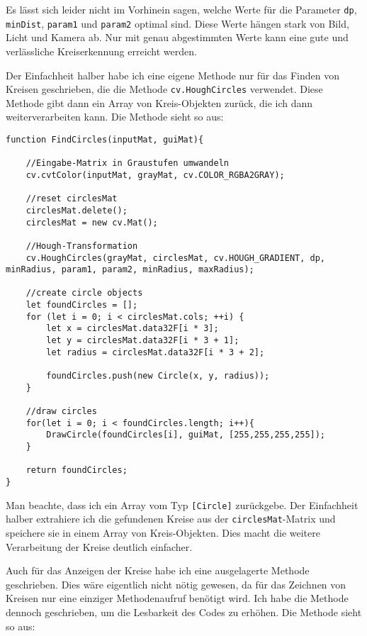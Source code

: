 Es lässt sich leider nicht im Vorhinein sagen, welche Werte für die Parameter \texttt{dp}, \texttt{minDist}, \texttt{param1} und \texttt{param2} optimal sind. Diese Werte hängen stark von Bild, Licht und Kamera ab. Nur mit genau abgestimmten Werte kann eine gute und verlässliche Kreiserkennung erreicht werden.

Der Einfachheit halber habe ich eine eigene Methode nur für das Finden von Kreisen geschrieben, die die Methode \texttt{cv.HoughCircles} verwendet. Diese Methode gibt dann ein Array von Kreis-Objekten zurück, die ich dann weiterverarbeiten kann. Die Methode sieht so aus:

\begin{lstlisting}[style=JavaScript]
function FindCircles(inputMat, guiMat){

    //Eingabe-Matrix in Graustufen umwandeln
    cv.cvtColor(inputMat, grayMat, cv.COLOR_RGBA2GRAY);

    //reset circlesMat
    circlesMat.delete();
    circlesMat = new cv.Mat();

    //Hough-Transformation
    cv.HoughCircles(grayMat, circlesMat, cv.HOUGH_GRADIENT, dp, minRadius, param1, param2, minRadius, maxRadius);

    //create circle objects
    let foundCircles = [];
    for (let i = 0; i < circlesMat.cols; ++i) {
        let x = circlesMat.data32F[i * 3];
        let y = circlesMat.data32F[i * 3 + 1];
        let radius = circlesMat.data32F[i * 3 + 2];

        foundCircles.push(new Circle(x, y, radius));
    }

    //draw circles
    for(let i = 0; i < foundCircles.length; i++){
        DrawCircle(foundCircles[i], guiMat, [255,255,255,255]);
    }

    return foundCircles;
}
\end{lstlisting}

Man beachte, dass ich ein Array vom Typ \texttt{[Circle]} zurückgebe. Der Einfachheit halber extrahiere ich die gefundenen Kreise aus der \texttt{circlesMat}-Matrix und speichere sie in einem Array von Kreis-Objekten. Dies macht die weitere Verarbeitung der Kreise deutlich einfacher.

Auch für das Anzeigen der Kreise habe ich eine ausgelagerte Methode geschrieben. Dies wäre eigentlich nicht nötig gewesen, da für das Zeichnen von Kreisen nur eine einziger Methodenaufruf benötigt wird. Ich habe die Methode dennoch geschrieben, um die Lesbarkeit des Codes zu erhöhen. Die Methode sieht so aus:

